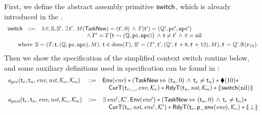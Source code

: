 First, we define the abstract assembly primitive $\mathsf{switch}$, which is 
already introduced in the \Sec{\ref{subsec:High-level Pseudo-SPARCv8 Language}}. 
{
    \small
    $$
    \begin{array}{lcl}
        \primsw & \define & 
        \lambda \, \args{\val}, \hpstate, \hpstate'. \ 
        \exists \, \thrdid'. \ 
        \Mem(\TaskNew) = (\thrdid', 0) \, \land \, 
        \thrdpool(\thrdid') = 
            (\hRstate', \pc', \npc') \\ 
        & & \hspace*{8em} \land \, 
        \thrdpool' = \thrdpool\{ \thrdid \rightsquigarrow 
        (\hRstate, \pc, \npc) \}
        \, \land \, \thrdid \neq \thrdid'
        \, \land \, \args{\val} = \nil \\
        \\[-8pt] 
        \multicolumn{3}{l}
        {
        	\hspace*{1.8em}
            \text{where } \, 
            \hpstate = 
                (\thrdpool, \thrdid, (\hRstate, \pc, \npc), \Mem), \, 
            \tid \in \dom(\thrdpool), \,
            \hpstate' = 
            (\thrdpool', \thrdid', 
            	(\hRstate', \lab{} + 8, \lab{} + 12), \Mem), \lab{} = \hRstate'.\hRfile(\reg{15}). 
        }
    \end{array}
    $$
}
Then we show the specification of the simplified context switch routine below, and some auxiliary 
definitions used in specification can be found in \Fig{\ref{def:aux-def-spec}}: 
{
    \small
    \[
        \begin{array}{lcl}
            \textit{a}_\textit{pre}(\textsf{t}_c, \textsf{t}_n, \textit{env}, \textit{nst}, \mathcal{K}_c, \mathcal{K}_n) 
            & ::\!\!{=} & 
            \mathsf{Env}({\textit{env}}) *
            ({\mathsf{TaskNew}}\Mapsto{(\textsf{t}_n, 0)} \, \land \, \textsf{t}_c \neq \textsf{t}_n) * 
            \blacklozenge({10}) * \\
            & & \quad 
            \textsf{CurT}({\textsf{t}_c}, {\underline{\ \,}}, {\textit{env}}, {\mathcal{K}_c}) * 
            \textsf{RdyT}({\textsf{t}_n}, {\textit{nst}}, {\mathcal{K}_n}) * 
            \llparenthesis {\, \mathsf{switch}(\text{nil}) \,} \rrparenthesis \\
            \\[-5pt]
            \textit{a}_\textit{post}(\textsf{t}_c, \textsf{t}_n, \textit{env}, \textit{nst}, \mathcal{K}_c, \mathcal{K}_n)
            & ::\!\!{=} & \exists \, \textit{env}', \mathcal{K}'. \, \mathsf{Env}({\textit{env}'}) 
            * ({\mathsf{TaskNew}}\Mapsto{(\textsf{t}_n, 0)} \, \land \, \textsf{t}_c \neq \textsf{t}_n) 
            * \\
            & & 
            \quad 
            \textsf{CurT}({\textsf{t}_n}, {\textit{nst}}, {\textit{env}'}, {\mathcal{K}'}) * 
            \textsf{RdyT}({\textsf{t}_c}, {\mathsf{p\_env}({\textit{env}})}, {\mathcal{K}_c}) * 
            \llparenthesis {\, \perp\,} \rrparenthesis  
        \end{array}
    \]
} 

